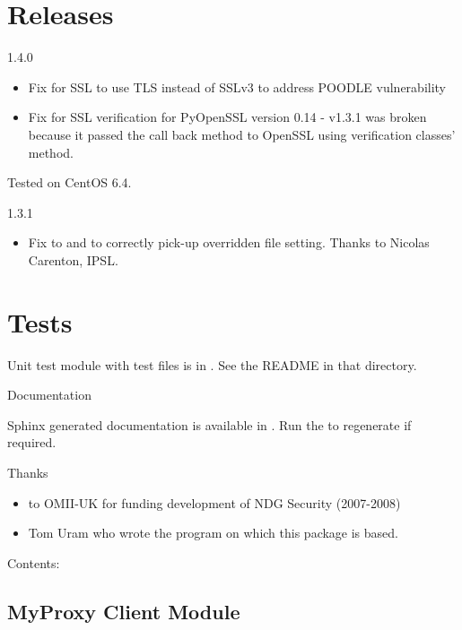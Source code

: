 \documentclass[letterpaper,10pt,english]{sphinxmanual}
\begin{document}


\chapter{Releases}
\label{index:releases}
1.4.0
\begin{itemize}
\item {} 
Fix for SSL to use TLS instead of SSLv3 to address POODLE vulnerability

\item {} 
Fix for SSL verification for PyOpenSSL version 0.14 - v1.3.1 was broken
because it passed the call back method to OpenSSL using verification classes'
 method.

\end{itemize}

Tested on CentOS 6.4.

1.3.1
\begin{itemize}
\item {} 
Fix to  and 
to correctly pick-up overridden file setting.  Thanks to Nicolas Carenton,
IPSL.

\end{itemize}


\chapter{Tests}
\label{index:tests}
Unit test module with test files is in .  See the README in that
directory.

Documentation

Sphinx generated documentation is available in .  Run the
 to regenerate if required.

Thanks
\begin{itemize}
\item {} 
to OMII-UK for funding development of NDG Security (2007-2008)

\item {} 
Tom Uram who wrote the  program on which this package is
based.

\end{itemize}

Contents:


\section{MyProxy Client Module}
\label{client:myproxy-client-module}\label{client::doc}
\end{document}
